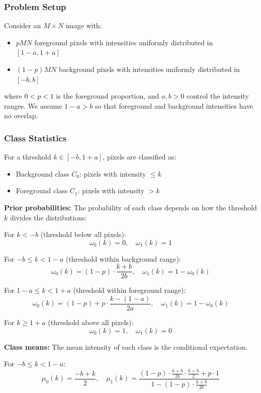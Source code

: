 \documentclass[11pt,a4paper]{article}
\begin{document}
\subsubsection{Problem Setup}
Consider an $M \times N$ image with:
\begin{itemize}
    \item $pMN$ foreground pixels with intensities uniformly distributed in $[1-a, 1+a]$
    \item $(1-p)MN$ background pixels with intensities uniformly distributed in $[-b, b]$
\end{itemize}

where $0 < p < 1$ is the foreground proportion, and $a, b > 0$ control the intensity ranges. We assume $1 - a > b$ so that foreground and background intensities have no overlap.

\subsubsection{Class Statistics}
For a threshold $k \in [-b, 1+a]$, pixels are classified as:
\begin{itemize}
    \item Background class $C_0$: pixels with intensity $\leq k$
    \item Foreground class $C_1$: pixels with intensity $> k$
\end{itemize}

\textbf{Prior probabilities:}
The probability of each class depends on how the threshold $k$ divides the distributions:

For $k < -b$ (threshold below all pixels):
$$\omega_0(k) = 0, \quad \omega_1(k) = 1$$

For $-b \leq k < 1-a$ (threshold within background range):
$$\omega_0(k) = (1-p) \cdot \frac{k+b}{2b}, \quad \omega_1(k) = 1 - \omega_0(k)$$

For $1-a \leq k < 1+a$ (threshold within foreground range):
$$\omega_0(k) = (1-p) + p \cdot \frac{k-(1-a)}{2a}, \quad \omega_1(k) = 1 - \omega_0(k)$$

For $k \geq 1+a$ (threshold above all pixels):
$$\omega_0(k) = 1, \quad \omega_1(k) = 0$$

\textbf{Class means:}
The mean intensity of each class is the conditional expectation.

For $-b \leq k < 1-a$:
$$\mu_0(k) = \frac{-b + k}{2}, \quad \mu_1(k) = \frac{(1-p) \cdot \frac{k+b}{2b} \cdot \frac{k+b}{2} + p \cdot 1}{1 - (1-p) \cdot \frac{k+b}{2b}}$$
\end{document}
